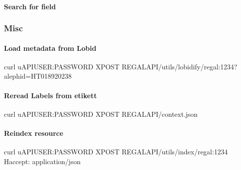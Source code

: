 \documentclass[letterpaper,10pt,english]{sphinxmanual}
\begin{document}
\paragraph{Search for field}
\label{\detokenize{api-toscience:search-for-field}}\label{\detokenize{api-toscience:id30}}

\subsubsection{Misc}
\label{\detokenize{api-toscience:misc}}\label{\detokenize{api-toscience:id31}}

\paragraph{Load metadata from Lobid}
\label{\detokenize{api-toscience:load-metadata-from-lobid}}\label{\detokenize{api-toscience:id32}}
\begin{sphinxVerbatim}[commandchars=\\\{\}]
curl \PYGZhy{}u\PYGZdl{}API\PYGZus{}USER:\PYGZdl{}PASSWORD \PYGZhy{}XPOST \PYGZdq{}\PYGZdl{}REGAL\PYGZus{}API/utils/lobidify/regal:1234?alephid=HT018920238\PYGZdq{}
\end{sphinxVerbatim}


\paragraph{Reread Labels from etikett}
\label{\detokenize{api-toscience:reread-labels-from-etikett}}\label{\detokenize{api-toscience:id33}}
\begin{sphinxVerbatim}[commandchars=\\\{\}]
curl \PYGZhy{}u\PYGZdl{}API\PYGZus{}USER:\PYGZdl{}PASSWORD \PYGZhy{}XPOST \PYGZdl{}REGAL\PYGZus{}API/context.json
\end{sphinxVerbatim}


\paragraph{Reindex resource}
\label{\detokenize{api-toscience:reindex-resource}}\label{\detokenize{api-toscience:id34}}
\begin{sphinxVerbatim}[commandchars=\\\{\}]
curl \PYGZhy{}u\PYGZdl{}API\PYGZus{}USER:\PYGZdl{}PASSWORD \PYGZhy{}XPOST \PYGZdl{}REGAL\PYGZus{}API/utils/index/regal:1234 \PYGZhy{}H\PYGZdq{}accept: application/json\PYGZdq{}
\end{sphinxVerbatim}
\end{document}
